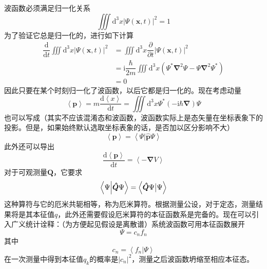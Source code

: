 \documentclass[12pt, a4paper, oneside]{ctexart}
\begin{document}
	波函数必须满足归一化关系
	\begin{equation}
		\iiint\mathrm{d}^{3}x\left|\Psi(\boldsymbol{x},t)\right|^{2}=1
	\end{equation}
	\quad\quad 为了验证它总是归一化的，进行如下计算
	\begin{align}
		\dfrac{\mathrm{d}}{\mathrm{d}t}\iiint\mathrm{d}^{3}x\left|\Psi(\boldsymbol{x},t)\right|^{2}&=\iiint\mathrm{d}^{3}x\dfrac{\partial}{\partial t}\left|\Psi(\boldsymbol{x},t)\right|^{2}\\
		&=\mathrm{i}\dfrac{\hbar}{2m}\iiint\mathrm{d}^{3}x\left(\Psi^{*}\boldsymbol{\nabla}^{2}\Psi-\Psi\boldsymbol{\nabla}^{2}\Psi^{*}\right)\\
		&=0
	\end{align}
	\quad\quad 因此只要在某个时刻归一化了波函数，以后它都是归一化的。现在考虑动量
	\begin{equation}
		\left<\boldsymbol{p}\right>=m\dfrac{\mathrm{d}\left<x\right>}{\mathrm{d}t}=\iiint\mathrm{d}^{3}x\Psi^{*}\left(-\mathrm{i}\hbar\boldsymbol{\nabla}\right)\Psi
	\end{equation}
	\quad\quad 也可以写成（其实不应该混淆态和波函数，波函数实际上是态矢量在坐标表象下的投影。但是，如果始终默认选取坐标表象的话，是否加以区分影响不大）
	\begin{equation}
		\left<\boldsymbol{p}\right>=\left<\Psi|\boldsymbol{\hat{p}}\Psi\right>
	\end{equation}
	\quad\quad 此外还可以导出
	\begin{equation}
		\dfrac{\mathrm{d}\left<\boldsymbol{p}\right>}{\mathrm{d}t}=\left<-\boldsymbol{\nabla}V\right>
	\end{equation}
	\quad\quad 对于可观测量$\boldsymbol{Q}$，它要求
	\begin{equation}
		\left<\Psi\Big{|}\boldsymbol{\hat{Q}}\Psi\right>=\left<\boldsymbol{\hat{Q}}\Psi\big{|}\Psi\right>
	\end{equation}
	\quad\quad 这种算符与它的厄米共轭相等，称为厄米算符。根据测量公设，对于定态，测量结果将是其本征值$q$，此外还需要假设厄米算符的本征函数系是完备的。现在可以引入广义统计诠释：（为方便起见假设是离散谱）系统波函数可用本征函数展开
	\begin{equation}
		\Psi=c_{n}f_{n}
	\end{equation}
	\quad\quad 其中
	\begin{equation}
		c_{n}=\left<f_{n}|\Psi\right>
	\end{equation}
	\quad\quad 在一次测量中得到本征值$q_{k}$的概率是$|c_{n}|^{2}$，测量之后波函数坍缩至相应本征态。\par 
\end{document}
